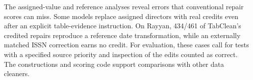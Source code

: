 \documentclass[sigconf, nonacm]{acmart}
\begin{document}
The assigned-value and reference analyses reveal errors that conventional repair scores can
miss. Some models replace assigned directors with real credits even after an explicit
table-evidence instruction. On Rayyan, 434/461 of TabClean's credited repairs reproduce a
reference date transformation, while an externally matched ISSN correction earns no credit.
For evaluation, these cases call for tests with a specified source priority and inspection of
the edits counted as correct. The constructions and scoring code support comparisons with
other data cleaners.

\clearpage
\nobalance


\end{document}
